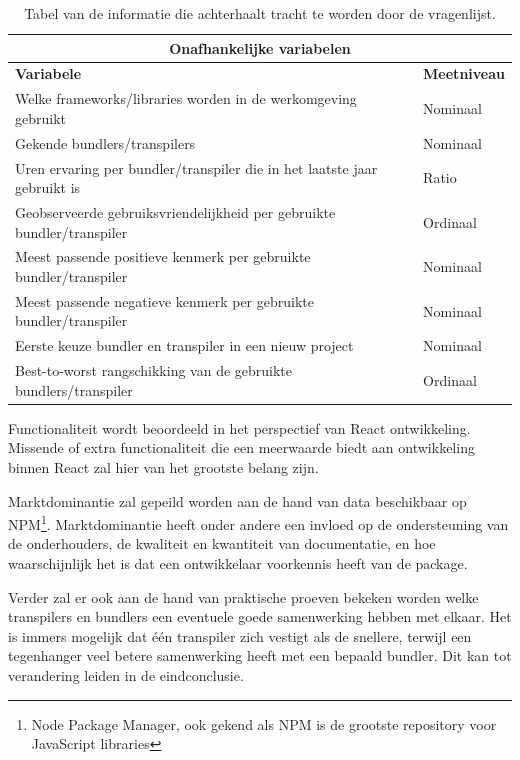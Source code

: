 \begin{table}[ht]
\begin{tabular}{|p{56mm}|l|} %
\hline
\multicolumn{2}{|c|}{\textbf{Onafhankelijke variabelen}}         \\ \hline
\textbf{Variabele}                         & \textbf{Meetniveau} \\ \hline
Welke frameworks/libraries worden in de werkomgeving gebruikt& Nominaal\\ \hline
Gekende bundlers/transpilers               & Nominaal            \\ \hline
Uren ervaring per bundler/transpiler die in het laatste jaar gebruikt is& Ratio\\ \hline
Geobserveerde gebruiksvriendelijkheid per gebruikte bundler/transpiler& Ordinaal\\ \hline
Meest passende positieve kenmerk per gebruikte bundler/transpiler& Nominaal\\ \hline
Meest passende negatieve kenmerk per gebruikte bundler/transpiler& Nominaal\\ \hline
Eerste keuze bundler en transpiler in een nieuw project& Nominaal\\ \hline
Best-to-worst rangschikking van de gebruikte bundlers/transpiler& Ordinaal\\ \hline
\end{tabular}
\caption{Tabel van de informatie die achterhaalt tracht te worden door de vragenlijst.}
\label{table:1}
\end{table}

Functionaliteit wordt beoordeeld in het perspectief van React ontwikkeling. Missende of extra functionaliteit die een meerwaarde biedt aan ontwikkeling binnen React zal hier van het grootste belang zijn.

Marktdominantie zal gepeild worden aan de hand van data beschikbaar op NPM\footnote{Node Package Manager, ook gekend als NPM is de grootste repository voor JavaScript libraries}. Marktdominantie heeft onder andere een invloed op de ondersteuning van de onderhouders, de kwaliteit en kwantiteit van documentatie, en hoe waarschijnlijk het is dat een ontwikkelaar voorkennis heeft van de package.

Verder zal er ook aan de hand van praktische proeven bekeken worden welke transpilers en bundlers een eventuele goede samenwerking hebben met elkaar. Het is immers mogelijk dat één transpiler zich vestigt als de snellere, terwijl een tegenhanger veel betere samenwerking heeft met een bepaald bundler. Dit kan tot verandering leiden in de eindconclusie.

